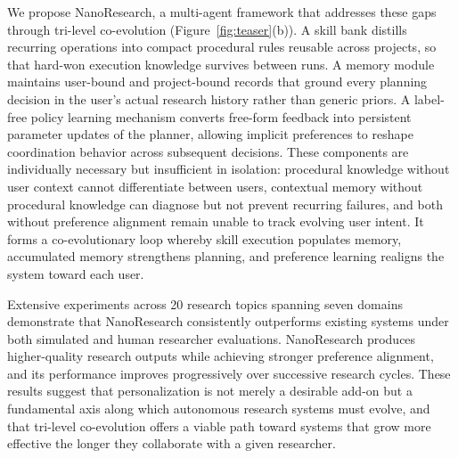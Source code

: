 \documentclass{opendatalab}
\begin{document}
We propose NanoResearch, a multi-agent framework that addresses these gaps through tri-level co-evolution (Figure~\ref{fig:teaser}(b)). A skill bank distills recurring operations into compact procedural rules reusable across projects, so that hard-won execution knowledge survives between runs. A memory module maintains user-bound and project-bound records that ground every planning decision in the user's actual research history rather than generic priors. A label-free policy learning mechanism converts free-form feedback into persistent parameter updates of the planner, allowing implicit preferences to reshape coordination behavior across subsequent decisions. These components are individually necessary but insufficient in isolation: procedural knowledge without user context cannot differentiate between users, contextual memory without procedural knowledge can diagnose but not prevent recurring failures, and both without preference alignment remain unable to track evolving user intent. It forms a co-evolutionary loop whereby skill execution populates memory, accumulated memory strengthens planning, and preference learning realigns the system toward each user.

Extensive experiments across 20 research topics spanning seven domains demonstrate that NanoResearch consistently outperforms existing systems under both simulated and human researcher evaluations. NanoResearch produces higher-quality research outputs while achieving stronger preference alignment, and its performance improves progressively over successive research cycles. These results suggest that personalization is not merely a desirable add-on but a fundamental axis along which autonomous research systems must evolve, and that tri-level co-evolution offers a viable path toward systems that grow more effective the longer they collaborate with a given researcher.
\end{document}
